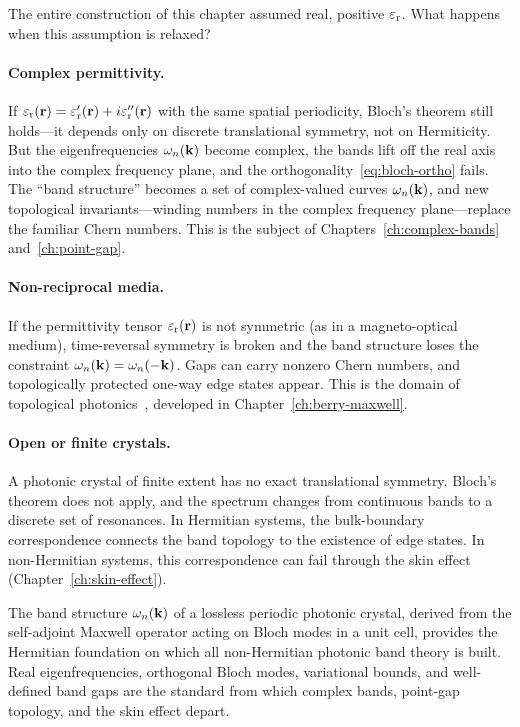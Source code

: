 The entire construction of this chapter assumed real, positive $\varepsilon_{\mathrm{r}}$.
What happens when this assumption is relaxed?

\paragraph{Complex permittivity.}
If $\varepsilon_{\mathrm{r}}(\mathbf{r}) = \varepsilon_{\mathrm{r}}'(\mathbf{r}) + i\varepsilon_{\mathrm{r}}''(\mathbf{r})$ with the same spatial
periodicity, Bloch's theorem still holds---it depends only on discrete
translational symmetry, not on Hermiticity. But the eigenfrequencies
$\omega_n(\mathbf{k})$ become complex, the bands lift off the real axis into the
complex frequency plane, and the orthogonality~\eqref{eq:bloch-ortho}
fails. The ``band structure'' becomes a set of complex-valued curves
$\omega_n(\mathbf{k})$, and new topological invariants---winding numbers in the
complex frequency plane---replace the familiar Chern numbers. This is
the subject of Chapters~\ref{ch:complex-bands} and~\ref{ch:point-gap}.

\paragraph{Non-reciprocal media.}
If the permittivity tensor $\varepsilon_{\mathrm{r}}(\mathbf{r})$ is not symmetric (as in a
magneto-optical medium), time-reversal symmetry is broken and the band
structure loses the constraint $\omega_n(\mathbf{k}) = \omega_n(-\mathbf{k})$. Gaps
can carry nonzero Chern numbers, and topologically protected one-way edge
states appear. This is the domain of topological photonics~\cite{ozawa2018topological,hafezi2013imaging,l2014topological}, developed in
Chapter~\ref{ch:berry-maxwell}.

\paragraph{Open or finite crystals.}
A photonic crystal of finite extent has no exact translational symmetry.
Bloch's theorem does not apply, and the spectrum changes from continuous
bands to a discrete set of resonances. In Hermitian systems, the
bulk-boundary correspondence connects the band topology to the existence
of edge states. In non-Hermitian systems, this correspondence can fail
through the skin effect
(Chapter~\ref{ch:skin-effect}).

\begin{takeaway}
The band structure $\omega_n(\mathbf{k})$ of a lossless periodic photonic crystal,
derived from the self-adjoint Maxwell operator acting on Bloch modes in a
unit cell, provides the Hermitian foundation on which all non-Hermitian
photonic band theory is built. Real eigenfrequencies, orthogonal Bloch
modes, variational bounds, and well-defined band gaps are the standard
from which complex bands, point-gap topology, and the skin effect depart.
\end{takeaway}
